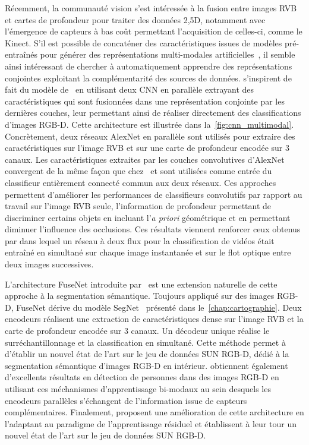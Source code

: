 Récemment, la communauté vision s'est intéressée à la fusion entre images \gls{RVB} et cartes de profondeur pour traiter des données 2,5D, notamment avec l'émergence de capteurs à bas coût permettant l'acquisition de celles-ci, comme le Kinect. S'il est possible de concaténer des caractéristiques issues de modèles pré-entraînés pour générer des représentations multi-modales artificielles~\cite{schwarz_rgb-d_2015,lagrange_benchmarking_2015}, il semble ainsi intéressant de chercher à automatiquement apprendre des représentations conjointes exploitant la complémentarité des sources de données. \citet{eitel_multimodal_2015,guo_two-stream_2016,song_combining_2017} s'inspirent de fait du modèle de~\citet{ngiam_multimodal_2011} en utilisant deux \gls{CNN} en parallèle extrayant des caractéristiques qui sont fusionnées dans une représentation conjointe par les dernières couches, leur permettant ainsi de réaliser directement des classifications d'images \gls{RGB-D}. Cette architecture est illustrée dans la~\cref{fig:cnn_multimodal}. Concrètement, deux réseaux AlexNet en parallèle sont utilisés pour extraire des caractéristiques sur l'image \gls{RVB} et sur une carte de profondeur encodée sur 3 canaux. Les caractéristiques extraites par les couches convolutives d'AlexNet convergent de la même façon que chez~\cite{ngiam_multimodal_2011} et sont utilisées comme entrée du classifieur entièrement connecté commun aux deux réseaux. Ces approches permettent d'améliorer les performances de classifieurs convolutifs par rapport au travail sur l'image \gls{RVB} seule, l'information de profondeur permettant de discriminer certains objets en incluant l'\emph{a priori} géométrique et en permettant diminuer l'influence des occlusions. Ces résultats viennent renforcer ceux obtenus par \citet{simonyan_two-stream_2014} dans lequel un réseau à deux flux pour la classification de vidéos était entraîné en simultané sur chaque image instantanée et sur le flot optique entre deux images successives.

L'architecture FuseNet introduite par~\citet{hazirbas_fusenet_2016} est une extension naturelle de cette approche à la segmentation sémantique. Toujours appliqué sur des images \gls{RGB-D}, FuseNet dérive du modèle SegNet~\cite{badrinarayanan_segnet_2017} présenté dans le~\cref{chap:cartographie}. Deux encodeurs réalisent une extraction de caractéristiques dense sur l'image \gls{RVB} et la carte de profondeur encodée sur 3 canaux. Un décodeur unique réalise le surréchantillonnage et la classification en simultané. Cette méthode permet à \citet{hazirbas_fusenet_2016} d'établir un nouvel état de l'art sur le jeu de données SUN RGB-D, dédié à la segmentation sémantique d'images \gls{RGB-D} en intérieur. \citet{guerry_look_2017} obtiennent également d'excellents résultats en détection de personnes dans des images \gls{RGB-D} en utilisant ces méchanismes d'apprentissage bi-modaux au sein desquels les encodeurs parallèles s'échangent de l'information issue de capteurs complémentaires. Finalement, \citet{lee_rdfnet_2017} proposent une amélioration de cette architecture en l'adaptant au paradigme de l'apprentissage résiduel et établissent à leur tour un nouvel état de l'art sur le jeu de données SUN RGB-D.

